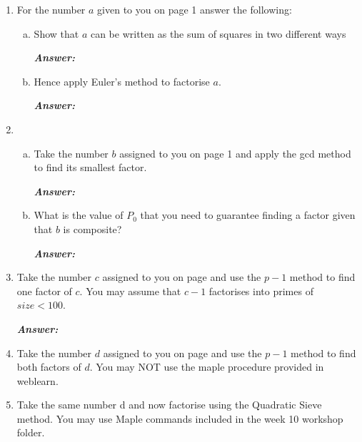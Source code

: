 \documentclass[11pt,a4paper,fleqn]{article}
\begin{document}
	\begin{enumerate}[1.]
		\item For the number $a$ given to you on page 1 answer the following:
		\begin{enumerate}[a.]
			\item Show that $a$ can be written as the sum of squares in two different ways
			\bigskip
			\begin{flushleft}
				\textbf{\textit{Answer:}}
			\end{flushleft}
			\item Hence apply Euler’s method to factorise $a$.
			\begin{flushleft}
				\textbf{\textit{Answer:}}
			\end{flushleft}
		\end{enumerate}
		\item
		\begin{enumerate}[(a)]
			\item Take the number $b$ assigned to you on page 1 and apply the gcd method to find its smallest factor.
			\begin{flushleft}
				\textbf{\textit{Answer:}}
			\end{flushleft}
			\item What is the value of $P_0$ that you need to guarantee finding a factor given that $b$ is composite?
			\begin{flushleft}
				\textbf{\textit{Answer:}}
			\end{flushleft}
		\end{enumerate}
		\item Take the number $c$ assigned to you on page and use the $p-1$ method to find one factor of $c$. You may assume that $c-1$ factorises into primes of $size < 100$.
		\begin{flushleft}
			\textbf{\textit{Answer:}}
		\end{flushleft}
		\item Take the number $d$ assigned to you on page and use the $p-1$ method to find both factors of $d$. You may NOT use the maple procedure provided in weblearn.
		\item Take the same number d and now factorise using the Quadratic Sieve method. You may use Maple commands included in the week 10 workshop folder.


\end{enumerate}
\end{document}
